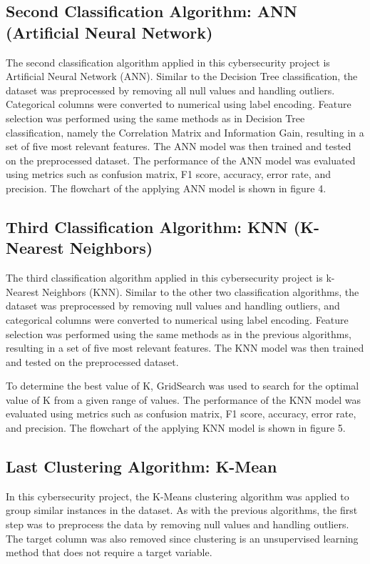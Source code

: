 \documentclass{article}
\begin{document}
\subsection{Second Classification Algorithm: ANN (Artificial Neural Network)}
The second classification algorithm applied in this cybersecurity project is Artificial Neural Network (ANN). Similar to the Decision Tree classification, the dataset was preprocessed by removing all null values and handling outliers. Categorical columns were converted to numerical using label encoding. Feature selection was performed using the same methods as in Decision Tree classification, namely the Correlation Matrix and Information Gain, resulting in a set of five most relevant features. The ANN model was then trained and tested on the preprocessed dataset. The performance of the ANN model was evaluated using metrics such as confusion matrix, F1 score, accuracy, error rate, and precision. The flowchart of the applying ANN model is shown in figure 4.

\subsection{Third Classification Algorithm: KNN (K-Nearest Neighbors)}
The third classification algorithm applied in this cybersecurity project is k-Nearest Neighbors (KNN). Similar to the other two classification algorithms, the dataset was preprocessed by removing null values and handling outliers, and categorical columns were converted to numerical using label encoding. Feature selection was performed using the same methods as in the previous algorithms, resulting in a set of five most relevant features. The KNN model was then trained and tested on the preprocessed dataset.

To determine the best value of K, GridSearch was used to search for the optimal value of K from a given range of values. The performance of the KNN model was evaluated using metrics such as confusion matrix, F1 score, accuracy, error rate, and precision. The flowchart of the applying KNN model is shown in figure 5.

\subsection{Last Clustering Algorithm: K-Mean}
In this cybersecurity project, the K-Means clustering algorithm was applied to group similar instances in the dataset. As with the previous algorithms, the first step was to preprocess the data by removing null values and handling outliers. The target column was also removed since clustering is an unsupervised learning method that does not require a target variable.
\end{document}
